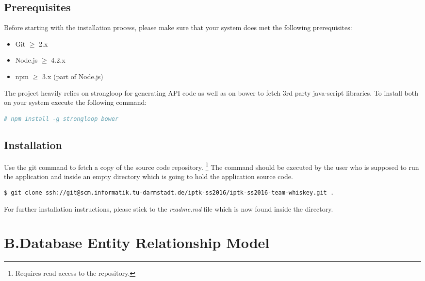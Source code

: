 \documentclass[nochapterpage,nopartpage,noheadingspace,numbersubsubsec,bigchapter,colorback,accentcolor=tud9c,10pt]{tudreport}
\begin{document}
  \section*{Prerequisites}
  \label{sec:appendix:setup:prerequisites}

    Before starting with the installation process, please make sure that your system does met the following prerequisites:
        \begin{multicols}{2}
        \begin{itemize}
            \item Git $\ge$ 2.x
            \item Node.js $\ge$ 4.2.x
            \item npm $\ge$ 3.x (part of Node.js)
        \end{itemize}
        \end{multicols}

    \noindent The project heavily relies on strongloop for generating API code as well as on bower to fetch 3rd party java-script libraries. To install both on your system execute the following command:
        \begin{lstlisting}[language=bash]
    # npm install -g strongloop bower
        \end{lstlisting}

  \section*{Installation}
  \label{sec:appendix:setup:install}

    \noindent Use the git command to fetch a copy of the source code repository.%
    \footnote{Requires read access to the repository.}
    The command should be executed by the user who is supposed to run the application and inside an empty directory which is going to hold the application source code.
        \begin{lstlisting}[language=bash]
    $ git clone ssh://git@scm.informatik.tu-darmstadt.de/iptk-ss2016/iptk-ss2016-team-whiskey.git .
        \end{lstlisting}
    For further installation instructions, please stick to the \emph{readme.md} file which is now found inside the directory.


  \chapter*{B.\quad Database Entity Relationship Model}
\end{document}

